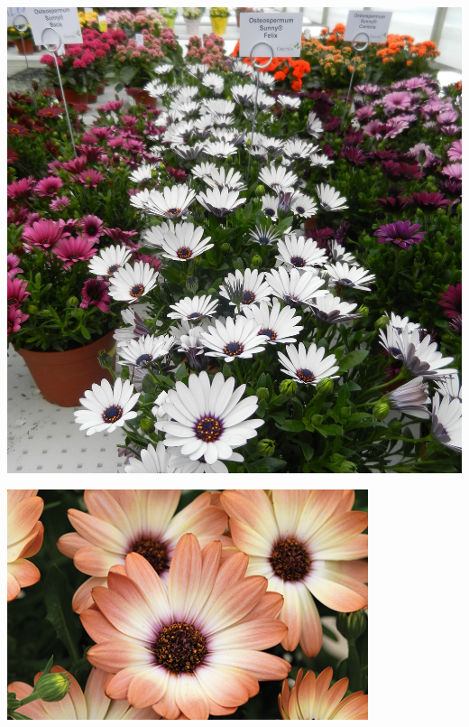 \documentclass{article}
\begin{document}
\begin{center}
\includegraphics[width=0.9\textheight, angle=90]{../Osteospermum.jpg}
\end{center}
\newpage

\begin{center}
\includegraphics[width=0.9\textheight, angle=90]{../Osteospermum3.jpg}
\end{center}
\newpage
\end{document}
